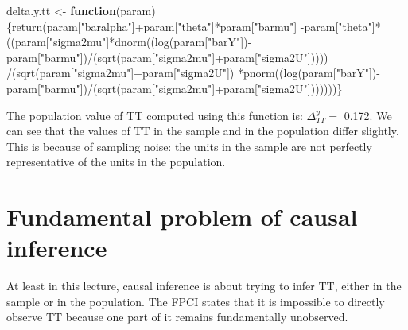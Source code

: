 \documentclass[
]{book}
\newenvironment{Shaded}{\begin{snugshade}}{\end{snugshade}}
\newcommand{\ControlFlowTok}[1]{\textcolor[rgb]{0.13,0.29,0.53}{\textbf{#1}}}
\newcommand{\FunctionTok}[1]{\textcolor[rgb]{0.00,0.00,0.00}{#1}}
\newcommand{\NormalTok}[1]{#1}
\newcommand{\OtherTok}[1]{\textcolor[rgb]{0.56,0.35,0.01}{#1}}
\newcommand{\SpecialCharTok}[1]{\textcolor[rgb]{0.00,0.00,0.00}{#1}}
\newcommand{\StringTok}[1]{\textcolor[rgb]{0.31,0.60,0.02}{#1}}
\theoremstyle{definition}
\theoremstyle{definition}
\theoremstyle{definition}
\theoremstyle{definition}
\theoremstyle{remark}
\begin{document}
\begin{Shaded}
\begin{Highlighting}[]
\NormalTok{delta.y.tt }\OtherTok{\textless{}{-}} \ControlFlowTok{function}\NormalTok{(param)\{}\FunctionTok{return}\NormalTok{(param[}\StringTok{"baralpha"}\NormalTok{]}\SpecialCharTok{+}\NormalTok{param[}\StringTok{"theta"}\NormalTok{]}\SpecialCharTok{*}\NormalTok{param[}\StringTok{"barmu"}\NormalTok{]}
                                     \SpecialCharTok{{-}}\NormalTok{param[}\StringTok{"theta"}\NormalTok{]}\SpecialCharTok{*}\NormalTok{((param[}\StringTok{"sigma2mu"}\NormalTok{]}\SpecialCharTok{*}\FunctionTok{dnorm}\NormalTok{((}\FunctionTok{log}\NormalTok{(param[}\StringTok{"barY"}\NormalTok{])}\SpecialCharTok{{-}}\NormalTok{param[}\StringTok{"barmu"}\NormalTok{])}\SpecialCharTok{/}\NormalTok{(}\FunctionTok{sqrt}\NormalTok{(param[}\StringTok{"sigma2mu"}\NormalTok{]}\SpecialCharTok{+}\NormalTok{param[}\StringTok{"sigma2U"}\NormalTok{]))))}
                                                      \SpecialCharTok{/}\NormalTok{(}\FunctionTok{sqrt}\NormalTok{(param[}\StringTok{"sigma2mu"}\NormalTok{]}\SpecialCharTok{+}\NormalTok{param[}\StringTok{"sigma2U"}\NormalTok{])}
                                                        \SpecialCharTok{*}\FunctionTok{pnorm}\NormalTok{((}\FunctionTok{log}\NormalTok{(param[}\StringTok{"barY"}\NormalTok{])}\SpecialCharTok{{-}}\NormalTok{param[}\StringTok{"barmu"}\NormalTok{])}\SpecialCharTok{/}\NormalTok{(}\FunctionTok{sqrt}\NormalTok{(param[}\StringTok{"sigma2mu"}\NormalTok{]}\SpecialCharTok{+}\NormalTok{param[}\StringTok{"sigma2U"}\NormalTok{]))))))\}}
\end{Highlighting}
\end{Shaded}

The population value of TT computed using this function is: \(\Delta^y_{TT}=\) 0.172.
We can see that the values of TT in the sample and in the population differ slightly.
This is because of sampling noise: the units in the sample are not perfectly representative of the units in the population.

\hypertarget{fundamental-problem-of-causal-inference}{%
\section{Fundamental problem of causal inference}\label{fundamental-problem-of-causal-inference}}

At least in this lecture, causal inference is about trying to infer TT, either in the sample or in the population.
The FPCI states that it is impossible to directly observe TT because one part of it remains fundamentally unobserved.
\end{document}

